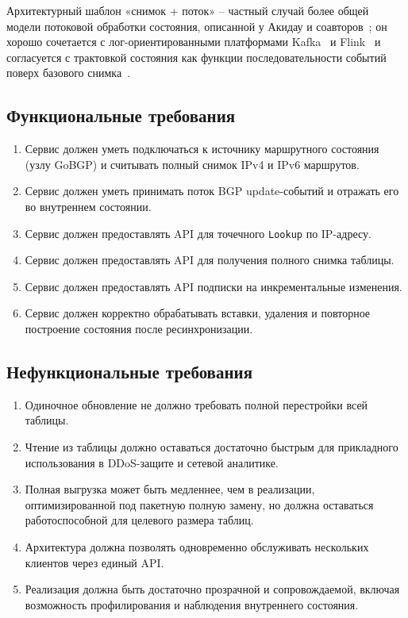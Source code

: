 Архитектурный шаблон «снимок + поток» -- частный случай более общей
модели потоковой обработки состояния, описанной у Акидау и
соавторов~\cite{akidau2015dataflow}; он хорошо сочетается с
лог-ориентированными платформами Kafka~\cite{kreps2011kafka} и
Flink~\cite{carbone2015flink} и согласуется с трактовкой состояния как
функции последовательности событий поверх базового
снимка~\cite{kleppmann2017ddia}.

\subsection{Функциональные требования}

\begin{enumerate}
\item Сервис должен уметь подключаться к источнику маршрутного
состояния (узлу GoBGP) и считывать полный снимок IPv4 и IPv6
маршрутов.
\item Сервис должен уметь принимать поток BGP update-событий и отражать
его во внутреннем состоянии.
\item Сервис должен предоставлять API для точечного \texttt{Lookup} по
IP-адресу.
\item Сервис должен предоставлять API для получения полного снимка
таблицы.
\item Сервис должен предоставлять API подписки на инкрементальные
изменения.
\item Сервис должен корректно обрабатывать вставки, удаления и
повторное построение состояния после ресинхронизации.
\end{enumerate}

\subsection{Нефункциональные требования}

\begin{enumerate}
\item Одиночное обновление не должно требовать полной перестройки всей
таблицы.
\item Чтение из таблицы должно оставаться достаточно быстрым для
прикладного использования в DDoS-защите и сетевой аналитике.
\item Полная выгрузка может быть медленнее, чем в реализации,
оптимизированной под пакетную полную замену, но должна оставаться
работоспособной для целевого размера таблиц.
\item Архитектура должна позволять одновременно обслуживать нескольких
клиентов через единый API.
\item Реализация должна быть достаточно прозрачной и сопровождаемой,
включая возможность профилирования и наблюдения внутреннего состояния.
\end{enumerate}

